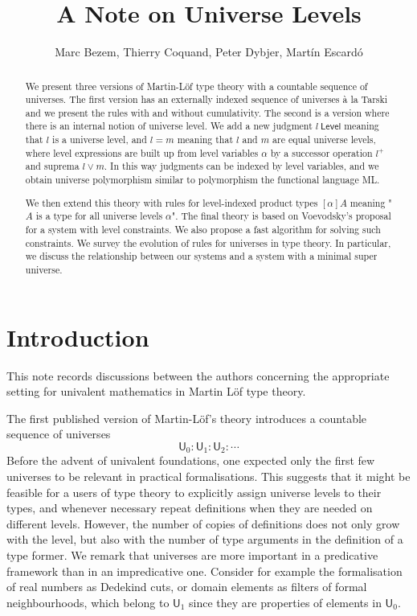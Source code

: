 \documentclass[11pt,a4paper]{article}
\def\UU{\mathsf{U}}
\def\Level{\mathsf{Level}}
\begin{document}
\title{A Note on Universe Levels}

\author{Marc Bezem, Thierry Coquand, Peter Dybjer, Mart\'in Escard\'o}
\date{}
\maketitle

\begin{abstract}
We present three versions of Martin-Löf type theory with a countable sequence of universes. The first version has an externally indexed sequence of universes \`a la Tarski and we present the rules with and without cumulativity. The second is a version where there is an internal notion of universe level. We add a new judgment $l\ \Level$ meaning that $l$ is a universe level, and $l = m$ meaning that $l$ and $m$ are equal universe levels, where level expressions are built up from level variables $\alpha$ by a successor operation $l^+$ and suprema $l \vee m$. In this way judgments can be indexed by level variables, and we obtain universe polymorphism similar to polymorphism the functional language ML. 

We then extend this theory with rules for level-indexed product types $[\alpha]A$ meaning "$A$ is a type for all universe levels $\alpha$". The final theory is based on Voevodsky's proposal for a system with level constraints. We also propose a fast algorithm for solving such constraints. We survey the evolution of rules for universes in type theory. In particular, we discuss the relationship between our systems and a system with a minimal super universe.
\end{abstract}

\section{Introduction}\label{sec:intros}

This note records discussions between the authors concerning the appropriate setting for univalent mathematics in Martin Löf type theory.

The first published version of Martin-Löf's theory \cite{martinlof:predicative} introduces a countable sequence of universes
$$
\UU_0 : \UU_1 : \UU_2 : \cdots
$$
Before the advent of univalent foundations, one expected only the first few universes to be relevant in practical formalisations. This suggests that it might be feasible for a users of type theory to explicitly assign universe levels to their types, and whenever necessary repeat definitions when they are needed on different levels. However, the number of copies of definitions does not only grow with the level, but also with the number of type arguments in the definition of a type former. We remark that universes are more important in a predicative framework than in an impredicative one. Consider for example the formalisation of real numbers as Dedekind cuts, or domain elements as filters of formal neighbourhoods, which belong to $\UU_1$ since they are properties of elements in $\UU_0$.
\end{document}
